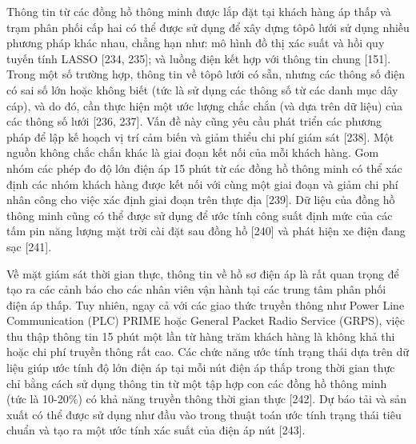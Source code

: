 \documentclass[utf8]{frontiersSCNS} %
\begin{document}
Thông tin từ các đồng hồ thông minh được lắp đặt tại khách hàng áp thấp và trạm phân phối cấp hai có thể được sử dụng để xây dựng tôpô lưới sử dụng nhiều phương pháp khác nhau, chẳng hạn như: mô hình đồ thị xác suất và hồi quy tuyến tính LASSO [234, 235]; và luồng điện kết hợp với thông tin chung [151]. Trong một số trường hợp, thông tin về tôpô lưới có sẵn, nhưng các thông số điện có sai số lớn hoặc không biết (tức là sử dụng các thông số từ các danh mục dây cáp), và do đó, cần thực hiện một ước lượng chắc chắn (và dựa trên dữ liệu) của các thông số lưới [236, 237]. Vấn đề này cũng yêu cầu phát triển các phương pháp để lập kế hoạch vị trí cảm biến và giảm thiểu chi phí giám sát [238]. Một nguồn không chắc chắn khác là giai đoạn kết nối của mỗi khách hàng. Gom nhóm các phép đo độ lớn điện áp 15 phút từ các đồng hồ thông minh có thể xác định các nhóm khách hàng được kết nối với cùng một giai đoạn và giảm chi phí nhân công cho việc xác định giai đoạn trên thực địa [239]. Dữ liệu của đồng hồ thông minh cũng có thể được sử dụng để ước tính công suất định mức của các tấm pin năng lượng mặt trời cài đặt sau đồng hồ [240] và phát hiện xe điện đang sạc [241].

Về mặt giám sát thời gian thực, thông tin về hồ sơ điện áp là rất quan trọng để tạo ra các cảnh báo cho các nhân viên vận hành tại các trung tâm phân phối điện áp thấp. Tuy nhiên, ngay cả với các giao thức truyền thông như Power Line Communication (PLC) PRIME hoặc General Packet Radio Service (GRPS), việc thu thập thông tin 15 phút một lần từ hàng trăm khách hàng là không khả thi hoặc chi phí truyền thông rất cao. Các chức năng ước tính trạng thái dựa trên dữ liệu giúp ước tính độ lớn điện áp tại mỗi nút điện áp thấp trong thời gian thực chỉ bằng cách sử dụng thông tin từ một tập hợp con các đồng hồ thông minh (tức là 10-20\%) có khả năng truyền thông thời gian thực [242]. Dự báo tải và sản xuất có thể được sử dụng như đầu vào trong thuật toán ước tính trạng thái tiêu chuẩn và tạo ra một ước tính xác suất của điện áp nút [243].
\end{document}
